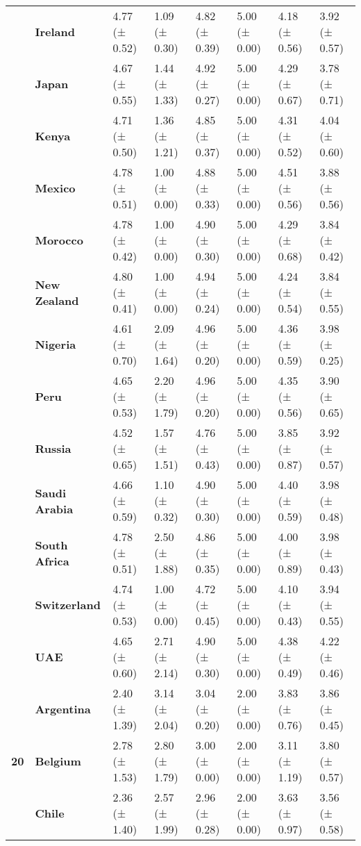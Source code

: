 \begin{longtable}{llllllll}
\textbf{} & \textbf{Ireland} & 4.77 (± 0.52) & 1.09 (± 0.30) & 4.82 (± 0.39) & 5.00 (± 0.00) & 4.18 (± 0.56) & 3.92 (± 0.57) \\
\textbf{} & \textbf{Japan} & 4.67 (± 0.55) & 1.44 (± 1.33) & 4.92 (± 0.27) & 5.00 (± 0.00) & 4.29 (± 0.67) & 3.78 (± 0.71) \\
\textbf{} & \textbf{Kenya} & 4.71 (± 0.50) & 1.36 (± 1.21) & 4.85 (± 0.37) & 5.00 (± 0.00) & 4.31 (± 0.52) & 4.04 (± 0.60) \\
\textbf{} & \textbf{Mexico} & 4.78 (± 0.51) & 1.00 (± 0.00) & 4.88 (± 0.33) & 5.00 (± 0.00) & 4.51 (± 0.56) & 3.88 (± 0.56) \\
\textbf{} & \textbf{Morocco} & 4.78 (± 0.42) & 1.00 (± 0.00) & 4.90 (± 0.30) & 5.00 (± 0.00) & 4.29 (± 0.68) & 3.84 (± 0.42) \\
\textbf{} & \textbf{New Zealand} & 4.80 (± 0.41) & 1.00 (± 0.00) & 4.94 (± 0.24) & 5.00 (± 0.00) & 4.24 (± 0.54) & 3.84 (± 0.55) \\
\textbf{} & \textbf{Nigeria} & 4.61 (± 0.70) & 2.09 (± 1.64) & 4.96 (± 0.20) & 5.00 (± 0.00) & 4.36 (± 0.59) & 3.98 (± 0.25) \\
\textbf{} & \textbf{Peru} & 4.65 (± 0.53) & 2.20 (± 1.79) & 4.96 (± 0.20) & 5.00 (± 0.00) & 4.35 (± 0.56) & 3.90 (± 0.65) \\
\textbf{} & \textbf{Russia} & 4.52 (± 0.65) & 1.57 (± 1.51) & 4.76 (± 0.43) & 5.00 (± 0.00) & 3.85 (± 0.87) & 3.92 (± 0.57) \\
\textbf{} & \textbf{Saudi Arabia} & 4.66 (± 0.59) & 1.10 (± 0.32) & 4.90 (± 0.30) & 5.00 (± 0.00) & 4.40 (± 0.59) & 3.98 (± 0.48) \\
\textbf{} & \textbf{South Africa} & 4.78 (± 0.51) & 2.50 (± 1.88) & 4.86 (± 0.35) & 5.00 (± 0.00) & 4.00 (± 0.89) & 3.98 (± 0.43) \\
\textbf{} & \textbf{Switzerland} & 4.74 (± 0.53) & 1.00 (± 0.00) & 4.72 (± 0.45) & 5.00 (± 0.00) & 4.10 (± 0.43) & 3.94 (± 0.55) \\
\textbf{} & \textbf{UAE} & 4.65 (± 0.60) & 2.71 (± 2.14) & 4.90 (± 0.30) & 5.00 (± 0.00) & 4.38 (± 0.49) & 4.22 (± 0.46) \\
\cline{1-8}
\multirow[t]{19}{*}{\textbf{20}} & \textbf{Argentina} & 2.40 (± 1.39) & 3.14 (± 2.04) & 3.04 (± 0.20) & 2.00 (± 0.00) & 3.83 (± 0.76) & 3.86 (± 0.45) \\
\textbf{} & \textbf{Belgium} & 2.78 (± 1.53) & 2.80 (± 1.79) & 3.00 (± 0.00) & 2.00 (± 0.00) & 3.11 (± 1.19) & 3.80 (± 0.57) \\
\textbf{} & \textbf{Chile} & 2.36 (± 1.40) & 2.57 (± 1.99) & 2.96 (± 0.28) & 2.00 (± 0.00) & 3.63 (± 0.97) & 3.56 (± 0.58) \\

\end{longtable}
